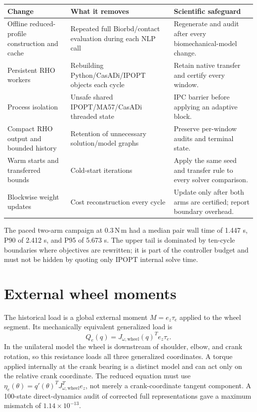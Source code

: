 \documentclass[10pt]{article}
\begin{document}
\begin{longtable}{@{}p{}p{}p{}@{}}
\toprule
Change & What it removes & Scientific safeguard\\
\midrule
\endhead
Offline reduced-profile construction and cache & Repeated full Biorbd/contact evaluation during each NLP call & Regenerate and audit after every biomechanical-model change.\\
Persistent RHO workers & Rebuilding Python/CasADi/IPOPT objects each cycle & Retain native transfer and certify every window.\\
Process isolation & Unsafe shared IPOPT/MA57/CasADi threaded state & IPC barrier before applying an adaptive block.\\
Compact RHO output and bounded history & Retention of unnecessary solution/model graphs & Preserve per-window audits and terminal state.\\
Warm starts and transferred bounds & Cold-start iterations & Apply the same seed and transfer rule to every solver comparison.\\
Blockwise weight updates & Cost reconstruction every cycle & Update only after both arms are certified; report boundary overhead.\\
\bottomrule
\end{longtable}

The paced two-arm campaign at $0.3\,$N\,m had a median pair wall time of 1.447 s, P90 of 2.412 s, and P95 of 5.673 s. The upper tail is dominated by ten-cycle boundaries where objectives are rewritten; it is part of the controller budget and must not be hidden by quoting only IPOPT internal solve time.

\section{External wheel moments}

The historical load is a global external moment $M=e_z\tau_e$ applied to the wheel segment. Its mechanically equivalent generalized load is
\[
Q_e(q)=J_{\omega,\mathrm{wheel}}(q)^T e_z\tau_e.
\]
In the unilateral model the wheel is downstream of shoulder, elbow, and crank rotation, so this resistance loads all three generalized coordinates. A torque applied internally at the crank bearing is a distinct model and can act only on the relative crank coordinate. The reduced equation must use $\eta_e(\theta)=q'(\theta)^TJ_{\omega,\mathrm{wheel}}^Te_z$, not merely a crank-coordinate tangent component. A 100-state direct-dynamics audit of corrected full representations gave a maximum mismatch of $1.14\times10^{-13}$.
\end{document}
